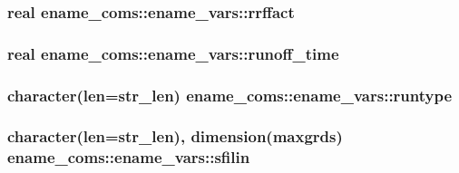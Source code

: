 \subsubsection[{rrffact}]{\setlength{\rightskip}{0pt plus 5cm}real ename\+\_\+coms\+::ename\+\_\+vars\+::rrffact}\label{structename__coms_1_1ename__vars_a397c3333debe6d9820a060dbcea0e08d}
\hypertarget{structename__coms_1_1ename__vars_aef08f776f2ef7d50653644b9eaf37fe7}{}
\subsubsection[{runoff\+\_\+time}]{\setlength{\rightskip}{0pt plus 5cm}real ename\+\_\+coms\+::ename\+\_\+vars\+::runoff\+\_\+time}\label{structename__coms_1_1ename__vars_aef08f776f2ef7d50653644b9eaf37fe7}
\hypertarget{structename__coms_1_1ename__vars_ac621d47b49d6ebf3a550bde26b79cb7a}{}
\subsubsection[{runtype}]{\setlength{\rightskip}{0pt plus 5cm}character(len=str\+\_\+len) ename\+\_\+coms\+::ename\+\_\+vars\+::runtype}\label{structename__coms_1_1ename__vars_ac621d47b49d6ebf3a550bde26b79cb7a}
\hypertarget{structename__coms_1_1ename__vars_a0b29a735224c75012629c5b99e08dad6}{}
\subsubsection[{sfilin}]{\setlength{\rightskip}{0pt plus 5cm}character(len=str\+\_\+len), dimension(maxgrds) ename\+\_\+coms\+::ename\+\_\+vars\+::sfilin}\label{structename__coms_1_1ename__vars_a0b29a735224c75012629c5b99e08dad6}
\hypertarget{structename__coms_1_1ename__vars_a88267d1c2a655cba72220200c9309fec}{}
